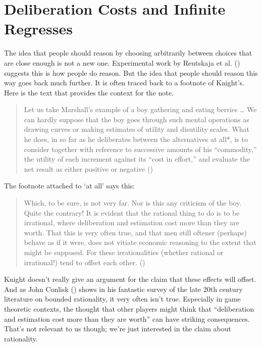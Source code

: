 \documentclass[
  12pt,
  letterpaper,
]{scrbook}
\begin{document}
\section{Deliberation Costs and Infinite
Regresses}\label{sec-deliberationcosts}

The idea that people should reason by choosing arbitrarily between
choices that are close enough is not a new one. Experimental work by
Reutskaja et al. () suggests this is
how people do reason. But the idea that people should reason this way
goes back much further. It is often traced back to a footnote of
Knight's. Here is the text that provides the context for the note.

\begin{quote}
Let us take Marshall's example of a boy gathering and eating berries
\ldots{} We can hardly suppose that the boy goes through such mental
operations as drawing curves or making estimates of utility and
disutility scales. What he does, in so far as he deliberates between the
alternatives at all*, is to consider together with reference to
successive amounts of his ``commodity,'' the utility of each increment
against its ``cost in effort,'' and evaluate the net result as either
positive or negative ()
\end{quote}

The footnote attached to `at all' says this:

\begin{quote}
Which, to be sure, is not very far. Nor is this any criticism of the
boy. Quite the contrary! It is evident that the rational thing to do is
to be irrational, where deliberation and estimation cost more than they
are worth. That this is very often true, and that men still oftener
(perhaps) behave as if it were, does not vitiate economic reasoning to
the extent that might be supposed. For these irrationalities (whether
rational or irrational!) tend to offset each other.
()
\end{quote}

Knight doesn't really give an argument for the claim that these effects
will offset. And as John Conlisk ()
shows in his fantastic survey of the late 20th century literature on
bounded rationality, it very often isn't true. Especially in game
theoretic contexts, the thought that other players might think that
``deliberation and estimation cost more than they are worth'' can have
striking consequences. That's not relevant to us though; we're just
interested in the claim about rationality.
\end{document}
